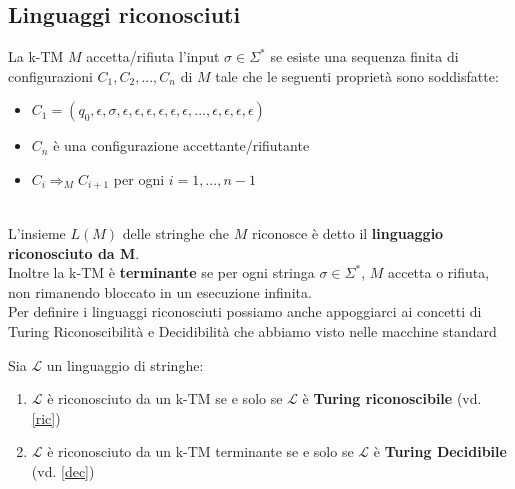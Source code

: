 \subsection{Linguaggi riconosciuti}
\colorbox{SALZO}{\parbox{\dimexpr\linewidth-2\fboxsep}{\begin{definition}
   La k-TM $M$ accetta/rifiuta l'input $\sigma \in \Sigma^*$ se esiste una sequenza finita di configurazioni
   $C_1,C_2,...,C_n$ di $M$ tale che le seguenti proprietà sono soddisfatte:
   \begin{itemize}
    \item $C_1 = (q_0, \epsilon, \sigma, \epsilon,\epsilon,\epsilon,\epsilon,\epsilon,\epsilon,...,\epsilon,\epsilon,\epsilon,\epsilon)$
    \item $C_n$ è una configurazione accettante/rifiutante
    \item $C_i \Rightarrow_{M} C_{i+1}$ per ogni $i = 1,...,n-1$
   \end{itemize}
\end{definition}}}\smallskip\\
L'insieme $L(M)$ delle stringhe che $M$ riconosce è detto il \textbf{linguaggio riconosciuto da M}.\\
Inoltre la k-TM è \textbf{terminante} se per ogni stringa $\sigma \in \Sigma^*$, $M$ accetta o rifiuta, non rimanendo bloccato in un esecuzione infinita.\smallskip\\
Per definire i linguaggi riconosciuti possiamo anche appoggiarci ai concetti di Turing Riconoscibilità e Decidibilità che abbiamo visto nelle macchine standard \smallskip\\
\colorbox{SALZO}{\parbox{\dimexpr\linewidth-2\fboxsep}{\begin{theorem}
   Sia $\mathcal{L}$ un linguaggio di stringhe:
   \begin{enumerate}
    \item $\mathcal{L}$ è riconosciuto da un k-TM se e solo se $\mathcal{L}$ è \textbf{Turing riconoscibile} (vd. \ref{ric})
    \item $\mathcal{L}$ è riconosciuto da un k-TM terminante se e solo se $\mathcal{L}$ è \textbf{Turing Decidibile} (vd. \ref{dec})
   \end{enumerate}
\end{theorem}}}

